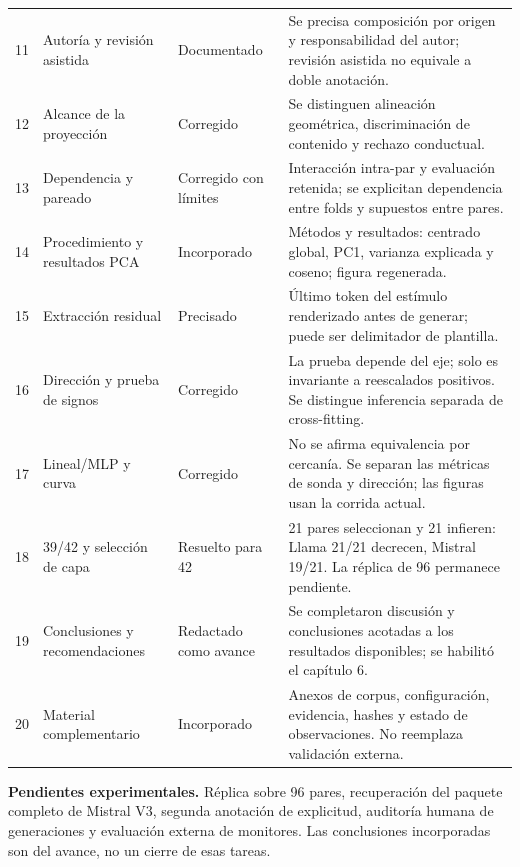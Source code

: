 \documentclass[10pt]{article}
\begin{document}
\begin{longtable}{@{}p{0.5cm}p{3.2cm}p{2.5cm}p{10.1cm}@{}}
11 & Autoría y revisión asistida & Documentado & Se precisa composición por origen y responsabilidad del autor; revisión asistida no equivale a doble anotación. \\[4pt]
12 & Alcance de la proyección & Corregido & Se distinguen alineación geométrica, discriminación de contenido y rechazo conductual. \\[4pt]
13 & Dependencia y pareado & Corregido con límites & Interacción intra-par y evaluación retenida; se explicitan dependencia entre folds y supuestos entre pares. \\[4pt]
14 & Procedimiento y resultados PCA & Incorporado & Métodos y resultados: centrado global, PC1, varianza explicada y coseno; figura regenerada. \\[4pt]
15 & Extracción residual & Precisado & Último token del estímulo renderizado antes de generar; puede ser delimitador de plantilla. \\[4pt]
16 & Dirección y prueba de signos & Corregido & La prueba depende del eje; solo es invariante a reescalados positivos. Se distingue inferencia separada de cross-fitting. \\[4pt]
17 & Lineal/MLP y curva & Corregido & No se afirma equivalencia por cercanía. Se separan las métricas de sonda y dirección; las figuras usan la corrida actual. \\[4pt]
18 & 39/42 y selección de capa & Resuelto para 42 & 21 pares seleccionan y 21 infieren: Llama 21/21 decrecen, Mistral 19/21. La réplica de 96 permanece pendiente. \\[4pt]
19 & Conclusiones y recomendaciones & Redactado como avance & Se completaron discusión y conclusiones acotadas a los resultados disponibles; se habilitó el capítulo 6. \\[4pt]
20 & Material complementario & Incorporado & Anexos de corpus, configuración, evidencia, hashes y estado de observaciones. No reemplaza validación externa. \\[4pt]
\bottomrule\end{longtable}
\normalsize
\textbf{Pendientes experimentales.} Réplica sobre 96 pares, recuperación del paquete completo de Mistral V3, segunda anotación de explicitud, auditoría humana de generaciones y evaluación externa de monitores. Las conclusiones incorporadas son del avance, no un cierre de esas tareas.
\end{document}
